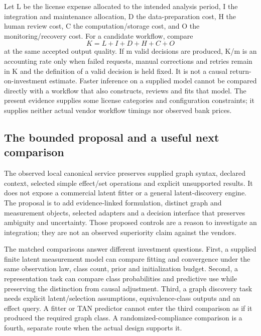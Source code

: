 Let L be the license expense allocated to the intended analysis period,
I the integration and maintenance allocation, D the data-preparation
cost, H the human review cost, C the computation/storage cost, and O the
monitoring/recovery cost. For a candidate workflow, compare \[
 K=L+I+D+H+C+O
\] at the same accepted output quality. If m valid decisions are
produced, K/m is an accounting rate only when failed requests, manual
corrections and retries remain in K and the definition of a valid
decision is held fixed. It is not a causal return-on-investment
estimate. Faster inference on a supplied model cannot be compared
directly with a workflow that also constructs, reviews and fits that
model. The present evidence supplies some license categories and
configuration constraints; it supplies neither actual vendor workflow
timings nor observed bank prices.

\hypertarget{the-bounded-proposal-and-a-useful-next-comparison}{%
\subsection{The bounded proposal and a useful next
comparison}\label{the-bounded-proposal-and-a-useful-next-comparison}}

The observed local canonical service preserves supplied graph syntax,
declared context, selected simple effect/set operations and explicit
unsupported results. It does not expose a commercial latent fitter or a
general latent-discovery engine. The proposal is to add evidence-linked
formulation, distinct graph and measurement objects, selected adapters
and a decision interface that preserves ambiguity and uncertainty. Those
proposed controls are a reason to investigate an integration; they are
not an observed superiority claim against the vendors.

The matched comparisons answer different investment questions.
First, a supplied finite latent measurement model can compare fitting
and convergence under the same observation law, class count, prior and
initialization budget. Second, a representation task can compare class
probabilities and predictive use while preserving the distinction from
causal adjustment. Third, a graph discovery task needs explicit
latent/selection assumptions, equivalence-class outputs and an effect
query. A fitter or TAN predictor cannot enter the third comparison as if
it produced the required graph class. A randomized-compliance comparison
is a fourth, separate route when the actual design supports it.

